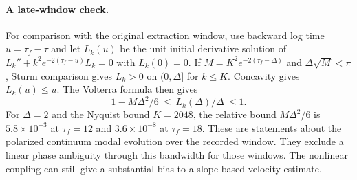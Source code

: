 \documentclass[11pt]{article}
\begin{document}
\paragraph{A late-window check.}
For comparison with the original extraction window, use backward log
time $u=\tau_f-\tau$ and let $L_k(u)$ be the unit initial derivative
solution of $L_k''+k^2e^{-2(\tau_f-u)}L_k=0$ with $L_k(0)=0$.
If $M=K^2e^{-2(\tau_f-\Delta)}$ and $\Delta\sqrt M<\pi$,
Sturm comparison gives $L_k>0$ on $(0,\Delta]$ for $k\le K$.
Concavity gives $L_k(u)\le u$. The Volterra formula then gives
\[
  1-M\Delta^2/6\ \le\ L_k(\Delta)/\Delta\ \le 1.
\]
For $\Delta=2$ and the Nyquist bound $K=2048$, the relative bound
$M\Delta^2/6$ is $5.8\times10^{-3}$ at $\tau_f=12$ and
$3.6\times10^{-8}$ at $\tau_f=18$. These are statements about the
polarized continuum modal evolution over the recorded window.
They exclude a linear phase ambiguity through this bandwidth
for those windows. The nonlinear coupling can still give a
substantial bias to a slope-based velocity estimate.


\end{document}
